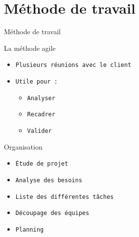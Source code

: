 \documentclass[10pt]{beamer}
\begin{document}
\section{Méthode de travail}
\begin{frame}{Méthode de travail}
	\begin{block}{La méthode agile}
	  	\begin{itemize}
	  		\item {\tt Plusieurs réunions avec le client}
	  		\item {\tt Utile pour : }
			  	\begin{itemize}
	  				\item {\tt Analyser}
    					\item {\tt Recadrer}
    					\item {\tt Valider}
				\end{itemize}    		
    			
		\end{itemize}
	\end{block}
	
	\begin{block}{Organisation}
		\begin{itemize}
	  		\item {\tt Étude de projet}   		
    			\item {\tt Analyse des besoins}
    			\item {\tt Liste des différentes tâches}
    			\item {\tt Découpage des équipes}
    			\item {\tt Planning}
		\end{itemize}
	\end{block}
\end{frame}

\end{document}
